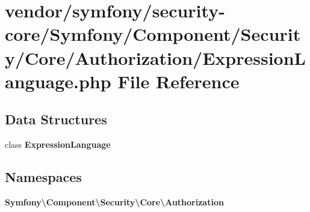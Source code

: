 \section{vendor/symfony/security-\/core/\+Symfony/\+Component/\+Security/\+Core/\+Authorization/\+Expression\+Language.php File Reference}
\label{_expression_language_8php}
\subsection*{Data Structures}
\begin{DoxyCompactItemize}
\item 
class {\bf Expression\+Language}
\end{DoxyCompactItemize}
\subsection*{Namespaces}
\begin{DoxyCompactItemize}
\item 
 {\bf Symfony\textbackslash{}\+Component\textbackslash{}\+Security\textbackslash{}\+Core\textbackslash{}\+Authorization}
\end{DoxyCompactItemize}

